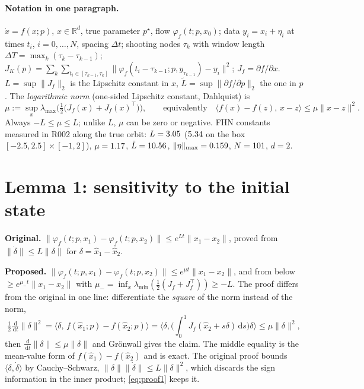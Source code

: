 \documentclass[10pt]{article}
\newcommand{\orig}[1]{\textcolor{black!60}{\textbf{Original.}} #1}
\newcommand{\prop}[1]{\textcolor{blue!60!black}{\textbf{Proposed.}} #1}
\newcommand{\norm}[1]{\lVert #1\rVert}
\newcommand{\dd}{\,\mathrm{d}}
\begin{document}
\paragraph{Notation in one paragraph.} $\dot x=f(x;p)$, $x\in\mathbb R^d$, true parameter $p^\star$, flow $\varphi_f(t;p,x_0)$; data $y_i=x_i+\eta_i$ at times $t_i$, $i=0,\dots,N$, spacing $\Delta t$; shooting nodes $\tau_k$ with window length $\Delta T=\max_k(\tau_k-\tau_{k-1})$; $J_K(p)=\sum_k\sum_{t_i\in[\tau_{k-1},\tau_k]}\norm{\varphi_f(t_i-\tau_{k-1};p,y_{\tau_{k-1}})-y_i}^2$; $J_f=\partial f/\partial x$. $L=\sup\norm{J_f}_2$ is the Lipschitz constant in $x$, $\tilde L=\sup\norm{\partial f/\partial p}_2$ the one in $p$. The \emph{logarithmic norm} (one-sided Lipschitz constant, Dahlquist) is
\begin{equation}\label{eq:mu}
\mu:=\sup_x\lambda_{\max}\!\Big(\tfrac12\big(J_f(x)+J_f(x)^\top\big)\Big),\qquad\text{equivalently}\quad \langle f(x)-f(z),\,x-z\rangle\le\mu\norm{x-z}^2 .
\end{equation}
Always $-L\le\mu\le L$; unlike $L$, $\mu$ can be zero or negative. FHN constants measured in R002 along the true orbit: $L=3.05$ ($5.34$ on the box $[-2.5,2.5]\times[-1,2]$), $\mu=1.17$, $\tilde L=10.56$, $\norm{\eta}_{\max}=\cetamax$, $N=101$, $d=2$.

\section{Lemma 1: sensitivity to the initial state}
\orig{} $\norm{\varphi_f(t;p,x_1)-\varphi_f(t;p,x_2)}\le e^{L t}\norm{x_1-x_2}$, proved from $\norm{\dot\delta}\le L\norm\delta$ for $\delta=\hat x_1-\hat x_2$.

\prop{} $\norm{\varphi_f(t;p,x_1)-\varphi_f(t;p,x_2)}\le e^{\mu t}\norm{x_1-x_2}$, and from below $\ge e^{\mu_- t}\norm{x_1-x_2}$ with $\mu_-=\inf_x\lambda_{\min}(\tfrac12(J_f+J_f^\top))\ge -L$. The proof differs from the original in one line: differentiate the \emph{square} of the norm instead of the norm,
\begin{equation}\label{eq:proof1}
\tfrac12\tfrac{\dd}{\dd t}\norm{\delta}^2=\big\langle\delta,\,f(\hat x_1;p)-f(\hat x_2;p)\big\rangle
=\Big\langle\delta,\Big(\textstyle\int_0^1 J_f(\hat x_2+s\delta)\dd s\Big)\delta\Big\rangle\le\mu\norm{\delta}^2 ,
\end{equation}
then $\tfrac{\dd}{\dd t}\norm\delta\le\mu\norm\delta$ and Gr\"onwall gives the claim. The middle equality is the mean-value form of $f(\hat x_1)-f(\hat x_2)$ and is exact. The original proof bounds $\langle\delta,\dot\delta\rangle$ by Cauchy--Schwarz, $\norm\delta\norm{\dot\delta}\le L\norm\delta^2$, which discards the sign information in the inner product; \eqref{eq:proof1} keeps it.
\end{document}

